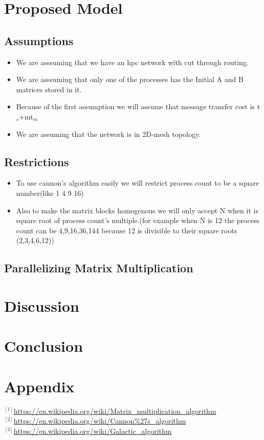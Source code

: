 \documentclass[12pt]{article}
\begin{document}
	\section{Proposed Model}
	\subsection{Assumptions}
	\begin{itemize}
		\item We are asssuming that we have an hpc network with cut through routing.
		\item We are asssuming that only one of the processes has the Initial A and B matrices stored in it.
		\item Because of the first assumption we will assume that message transfer cost is t$_s$+mt$_m$
		\item We are assuming that the network is in 2D-mesh topology.
	\end{itemize}
	\subsection{Restrictions}
	\begin{itemize}
		\item To use cannon's algorithm easily we will restrict process count to be a square number(like 1 4 9 16)
		\item Also to make the matrix blocks homogenous we will only accept N when it is square root of process count's multiple.(for example when N is 12 the process count can be 4,9,16,36,144 because 12 is divisible to their square roots (2,3,4,6,12))
		
	\end{itemize}
	
	\subsection{ Parallelizing Matrix Multiplication}
	
	
	\section{Discussion}
	
	
	\section{Conclusion}
	

	\section{Appendix}
	
	
	\newpage
	
	
	
	$^{[1]}$\url{https://en.wikipedia.org/wiki/Matrix_multiplication_algorithm}\\
	$^{[2]}$\url{https://en.wikipedia.org/wiki/Cannon%27s_algorithm}\\
	$^{[3]}$\url{https://en.wikipedia.org/wiki/Galactic_algorithm}\\
	
	
\end{document}
